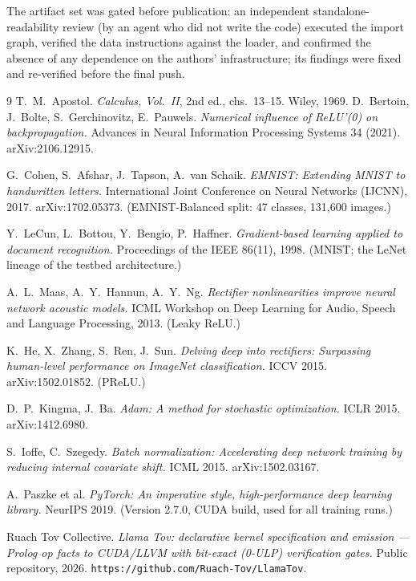 \documentclass[11pt]{article}
\begin{document}
The artifact set was gated before publication: an independent
standalone-readability review (by an agent who did not write the
code) executed the import graph, verified the data instructions
against the loader, and confirmed the absence of any dependence on
the authors' infrastructure; its findings were fixed and re-verified
before the final push.

\begin{thebibliography}{9}
 T.~M.~Apostol.
\emph{Calculus, Vol.~II}, 2nd ed., chs.~13--15. Wiley, 1969.
D.~Bertoin, J.~Bolte, S.~Gerchinovitz, E.~Pauwels.
\emph{Numerical influence of ReLU'(0) on backpropagation.}
Advances in Neural Information Processing Systems 34 (2021).
arXiv:2106.12915.

G.~Cohen, S.~Afshar, J.~Tapson, A.~van Schaik.
\emph{EMNIST: Extending MNIST to handwritten letters.}
International Joint Conference on Neural Networks (IJCNN), 2017.
arXiv:1702.05373. (EMNIST-Balanced split: 47 classes, 131{,}600 images.)

Y.~LeCun, L.~Bottou, Y.~Bengio, P.~Haffner.
\emph{Gradient-based learning applied to document recognition.}
Proceedings of the IEEE 86(11), 1998. (MNIST; the LeNet lineage of the
testbed architecture.)

A.~L.~Maas, A.~Y.~Hannun, A.~Y.~Ng.
\emph{Rectifier nonlinearities improve neural network acoustic models.}
ICML Workshop on Deep Learning for Audio, Speech and Language
Processing, 2013. (Leaky ReLU.)

K.~He, X.~Zhang, S.~Ren, J.~Sun.
\emph{Delving deep into rectifiers: Surpassing human-level performance
on ImageNet classification.} ICCV 2015. arXiv:1502.01852. (PReLU.)

D.~P.~Kingma, J.~Ba.
\emph{Adam: A method for stochastic optimization.}
ICLR 2015. arXiv:1412.6980.

S.~Ioffe, C.~Szegedy.
\emph{Batch normalization: Accelerating deep network training by
reducing internal covariate shift.} ICML 2015. arXiv:1502.03167.

A.~Paszke et al.
\emph{PyTorch: An imperative style, high-performance deep learning
library.} NeurIPS 2019. (Version 2.7.0, CUDA build, used for all
training runs.)

Ruach Tov Collective.
\emph{Llama Tov: declarative kernel specification and emission ---
Prolog op facts to CUDA/LLVM with bit-exact (0-ULP) verification
gates.} Public repository, 2026.
\texttt{https://github.com/Ruach-Tov/LlamaTov}.
\end{thebibliography}
\end{document}
